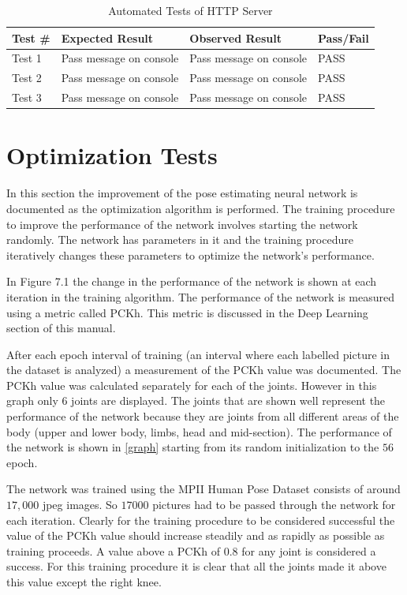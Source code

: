 \documentclass{scrreprt}
\begin{document}
\begin{table}
\caption{Automated Tests of HTTP Server}
\begin{center}
\begin{tabular}{p{3cm} p{4cm} p{4cm} p{4cm}}
\hline
\textbf Test \#  & Expected Result & Observed Result & Pass/Fail  \\
\hline
Test 1 & Pass message on console & Pass message on console & PASS \\
\hline
Test 2 & Pass message on console & Pass message on console & PASS \\
\hline
Test 3 & Pass message on console & Pass message on console & PASS \\
\hline
\end{tabular}
\end{center}
\end{table}


\section{Optimization Tests}

In this section the improvement of the pose estimating neural network is documented as the optimization algorithm is performed.  The training procedure to improve the performance of the network involves starting the network randomly.  The network has parameters in it and the training procedure iteratively changes these parameters to optimize the network's performance.

In Figure 7.1 the change in the performance of the network is shown at each iteration in the training algorithm.  The performance of the network is measured using a metric called PCKh.  This metric is discussed in the Deep Learning section of this manual.

After each epoch interval of training (an interval where each labelled picture in the dataset is analyzed) a measurement of the PCKh value was documented.  The PCKh value was calculated separately for each of the joints.  However in this graph only $6$ joints are displayed.  The joints that are shown well represent the performance of the network because they are joints from all different areas of the body (upper and lower body, limbs, head and mid-section).  The performance of the network is shown in \ref{graph} starting from its random initialization to the $56$ epoch.

The network was trained using the MPII Human Pose Dataset consists of around $17,000$ jpeg images.  So $17000$ pictures had to be passed through the network for each iteration.  Clearly for the training procedure to be considered successful the value of the PCKh value should increase steadily and as rapidly as possible as training proceeds.  A value above a PCKh of $0.8$ for any joint is considered a success.  For this training procedure it is clear that all the joints made it above this value except the right knee.
\end{document}
